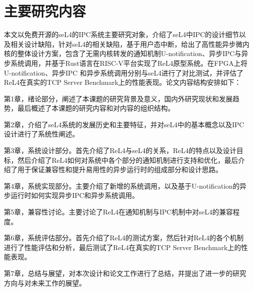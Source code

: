 \section{主要研究内容}
本文以免费开源的seL4的IPC系统主要研究对象，介绍了seL4中IPC的设计细节以及相关设计缺陷，针对seL4的相关缺陷，基于用户态中断，给出了高性能异步微内核的整体设计方案，包含了无需内核转发的通知机制U-notification、异步IPC与异步系统调用，并基于Rust语言在RISC-V平台实现了ReL4原型系统。在FPGA上将U-notification、异步IPC 和异步系统调用分别与seL4进行了对比测试，并评估了ReL4在真实的TCP Server Benchmark上的性能表现。论文内容结构安排如下：

第1章，绪论部分，阐述了本课题的研究背景及意义，国内外研究现状和发展趋势，最后概述了本课题的研究内容和对内容的组织结构。

第2章，介绍了seL4系统的发展历史和主要特征，并对seL4中的基本概念以及IPC设计进行了系统性阐述。

第3章，系统设计部分。首先介绍了ReL4与seL4的关系，ReL4的特点以及设计目标，然后介绍了ReL4如何对系统中各个部分的通知机制进行支持和优化，最后介绍了用于保证兼容性和提升易用性的异步运行时的组成部分和设计思路。

第4章，系统实现部分。主要介绍了新增的系统调用，以及基于U-notification的异步运行时如何实现异步IPC和异步系统调用。

第5章，兼容性讨论。主要讨论了ReL4在通知机制与IPC机制中对seL4的兼容程度。

第6章，系统评估部分。首先介绍了ReL4的测试方案，然后针对ReL4的各个机制进行了性能评估和分析，最后测试了ReL4在真实的TCP Server Benchmark上的性能表现。

第7章，总结与展望，对本次设计和论文工作进行了总结，并提出了进一步的研究方向与对未来工作的展望。